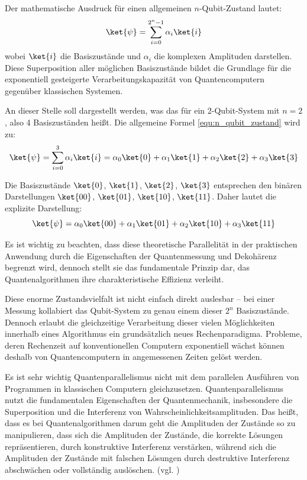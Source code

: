 Der mathematische Ausdruck für einen allgemeinen $n$-Qubit-Zustand lautet:
\begin{equation}
\ket{\psi} = \sum_{i=0}^{2^n-1} \alpha_i \ket{i}
\label{equ:n_qubit_zustand}
\end{equation}
wobei $\ket{i}$ die Basiszustände und $\alpha_i$ die komplexen Amplituden darstellen. Diese Superposition aller möglichen Basiszustände bildet die Grundlage für die exponentiell gesteigerte Verarbeitungskapazität von Quantencomputern gegenüber klassischen Systemen.

An dieser Stelle soll dargestellt werden, was das für ein 2-Qubit-System mit $n = 2$, also 4 Basiszuständen heißt. Die allgemeine Formel \ref{equ:n_qubit_zustand}
wird zu:
\begin{equation}
\ket{\psi} = \sum_{i=0}^{3} \alpha_i \ket{i} = \alpha_0 \ket{0} + \alpha_1 \ket{1} + \alpha_2 \ket{2} + \alpha_3 \ket{3}
\end{equation}

Die Basiszustände $\ket{0}$, $\ket{1}$, $\ket{2}$, $\ket{3}$ entsprechen den binären Darstellungen $\ket{00}$, $\ket{01}$, $\ket{10}$, $\ket{11}$. Daher lautet die explizite Darstellung:
\begin{equation}
\ket{\psi} = \alpha_0 \ket{00} + \alpha_1 \ket{01} + \alpha_2 \ket{10} + \alpha_3 \ket{11}
\end{equation}

Es ist wichtig zu beachten, dass diese theoretische Parallelität in der praktischen Anwendung durch die Eigenschaften der Quantenmessung und Dekohärenz begrenzt wird, dennoch stellt sie das fundamentale Prinzip dar, das Quantenalgorithmen ihre charakteristische Effizienz verleiht.

Diese enorme Zustandsvielfalt ist nicht einfach direkt auslesbar – bei einer Messung kollabiert das Qubit-System zu genau einem dieser \(2^n\) Basiszustände. Dennoch erlaubt die gleichzeitige Verarbeitung dieser vielen Möglichkeiten innerhalb eines Algorithmus ein grundsätzlich neues Rechenparadigma. Probleme, deren Rechenzeit auf konventionellen Computern exponentiell wächst können deshalb von Quantencomputern in angemessenen Zeiten gelöst werden. 

Es ist sehr wichtig Quantenparallelismus nicht mit dem parallelen Ausführen von Programmen in klassischen Computern gleichzusetzen. Quantenparallelismus nutzt die fundamentalen Eigenschaften der Quantenmechanik, insbesondere die Superposition und die Interferenz von Wahrscheinlichkeitsamplituden. Das heißt, dass es bei Quantenalgorithmen darum geht die Amplituden der Zustände so zu manipulieren, dass sich die Amplituden der Zustände, die korrekte Lösungen repräsentieren, durch konstruktive Interferenz verstärken, während sich die Amplituden der Zustände mit falschen Lösungen durch destruktive Interferenz abschwächen oder vollständig auslöschen. (vgl. \cite[16 f.]{nielsen_quantum_2010})

